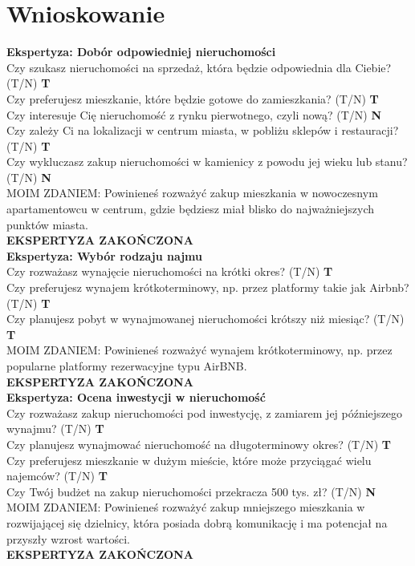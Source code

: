 \section{Wnioskowanie}
\noindent \textbf{Ekspertyza: Dobór odpowiedniej nieruchomości}\\
\noindent Czy szukasz nieruchomości na sprzedaż, która będzie odpowiednia dla Ciebie? (T/N) \textbf{T} \\
\noindent Czy preferujesz mieszkanie, które będzie gotowe do zamieszkania? (T/N) \textbf{T} \\
\noindent Czy interesuje Cię nieruchomość z rynku pierwotnego, czyli nową? (T/N) \textbf{N} \\
\noindent Czy zależy Ci na lokalizacji w centrum miasta, w pobliżu sklepów i restauracji? (T/N) \textbf{T} \\
\noindent Czy wykluczasz zakup nieruchomości w kamienicy z powodu jej wieku lub stanu? (T/N) \textbf{N} \\
MOIM ZDANIEM: Powinieneś rozważyć zakup mieszkania w nowoczesnym apartamentowcu w centrum, gdzie będziesz miał blisko do najważniejszych punktów miasta.\\
\textbf{EKSPERTYZA ZAKOŃCZONA}\\

\noindent \textbf{Ekspertyza: Wybór rodzaju najmu}\\
\noindent Czy rozważasz wynajęcie nieruchomości na krótki okres? (T/N) \textbf{T} \\
\noindent Czy preferujesz wynajem krótkoterminowy, np. przez platformy takie jak Airbnb? (T/N) \textbf{T} \\
\noindent Czy planujesz pobyt w wynajmowanej nieruchomości krótszy niż miesiąc? (T/N) \textbf{T} \\
MOIM ZDANIEM: Powinieneś rozważyć wynajem krótkoterminowy, np. przez popularne platformy rezerwacyjne typu AirBNB.\\
\textbf{EKSPERTYZA ZAKOŃCZONA}\\

\noindent \textbf{Ekspertyza: Ocena inwestycji w nieruchomość}\\
\noindent Czy rozważasz zakup nieruchomości pod inwestycję, z zamiarem jej późniejszego wynajmu? (T/N) \textbf{T} \\
\noindent Czy planujesz wynajmować nieruchomość na długoterminowy okres? (T/N) \textbf{T} \\
\noindent Czy preferujesz mieszkanie w dużym mieście, które może przyciągać wielu najemców? (T/N) \textbf{T} \\
\noindent Czy Twój budżet na zakup nieruchomości przekracza 500 tys. zł? (T/N) \textbf{N} \\
MOIM ZDANIEM: Powinieneś rozważyć zakup mniejszego mieszkania w rozwijającej się dzielnicy, która posiada dobrą komunikację i ma potencjał na przyszły wzrost wartości.\\
\textbf{EKSPERTYZA ZAKOŃCZONA}\\

